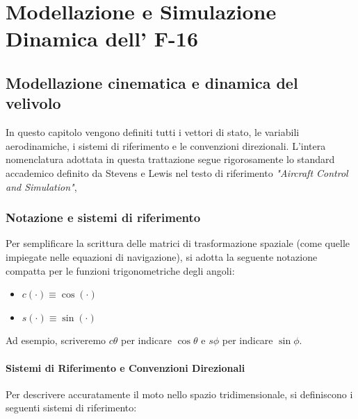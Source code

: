 \part{Modellazione e Simulazione Dinamica dell' F-16}
\label{cap1}
\chapter{Modellazione cinematica e dinamica del velivolo}
In questo capitolo vengono definiti tutti i vettori di stato, le variabili aerodinamiche, i sistemi di riferimento e le convenzioni direzionali. L'intera nomenclatura adottata in questa trattazione segue rigorosamente lo standard accademico definito da Stevens e Lewis nel testo di riferimento \textit{"Aircraft Control and Simulation"},\cite{stevens2015aircraft}
\section{Notazione e sistemi di riferimento}
Per semplificare la scrittura delle matrici di trasformazione spaziale (come quelle impiegate nelle equazioni di navigazione), si adotta la seguente notazione compatta per le funzioni trigonometriche degli angoli:
\begin{itemize}
    \item $c(\cdot) \equiv \cos(\cdot)$
    \item $s(\cdot) \equiv \sin(\cdot)$
\end{itemize}
Ad esempio, scriveremo $c\theta$ per indicare $\cos\theta$ e $s\phi$ per indicare $\sin\phi$.

\subsection*{Sistemi di Riferimento e Convenzioni Direzionali}
Per descrivere accuratamente il moto nello spazio tridimensionale, si definiscono i seguenti sistemi di riferimento:


